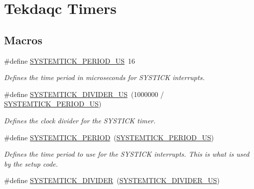 \hypertarget{group__tekdaqc__timers}{\section{Tekdaqc Timers}
\label{group__tekdaqc__timers}
}
\subsection*{Macros}
\begin{DoxyCompactItemize}
\item 
\hypertarget{group__tekdaqc__timers_gacc6f2ef6fc22ccd784d38b7de6f22492}{\#define \hyperlink{group__tekdaqc__timers_gacc6f2ef6fc22ccd784d38b7de6f22492}{S\-Y\-S\-T\-E\-M\-T\-I\-C\-K\-\_\-\-P\-E\-R\-I\-O\-D\-\_\-\-U\-S}~16}\label{group__tekdaqc__timers_gacc6f2ef6fc22ccd784d38b7de6f22492}

\begin{DoxyCompactList}\small\item\em Defines the time period in microseconds for S\-Y\-S\-T\-I\-C\-K interrupts. \end{DoxyCompactList}\item 
\hypertarget{group__tekdaqc__timers_gad688df41f76297601fe702bd24190525}{\#define \hyperlink{group__tekdaqc__timers_gad688df41f76297601fe702bd24190525}{S\-Y\-S\-T\-E\-M\-T\-I\-C\-K\-\_\-\-D\-I\-V\-I\-D\-E\-R\-\_\-\-U\-S}~(1000000 / \hyperlink{group__tekdaqc__timers_gacc6f2ef6fc22ccd784d38b7de6f22492}{S\-Y\-S\-T\-E\-M\-T\-I\-C\-K\-\_\-\-P\-E\-R\-I\-O\-D\-\_\-\-U\-S})}\label{group__tekdaqc__timers_gad688df41f76297601fe702bd24190525}

\begin{DoxyCompactList}\small\item\em Defines the clock divider for the S\-Y\-S\-T\-I\-C\-K timer. \end{DoxyCompactList}\item 
\hypertarget{group__tekdaqc__timers_ga7061932395158f1a4988896f1b32a8b3}{\#define \hyperlink{group__tekdaqc__timers_ga7061932395158f1a4988896f1b32a8b3}{S\-Y\-S\-T\-E\-M\-T\-I\-C\-K\-\_\-\-P\-E\-R\-I\-O\-D}~(\hyperlink{group__tekdaqc__timers_gacc6f2ef6fc22ccd784d38b7de6f22492}{S\-Y\-S\-T\-E\-M\-T\-I\-C\-K\-\_\-\-P\-E\-R\-I\-O\-D\-\_\-\-U\-S})}\label{group__tekdaqc__timers_ga7061932395158f1a4988896f1b32a8b3}

\begin{DoxyCompactList}\small\item\em Defines the time period to use for the S\-Y\-S\-T\-I\-C\-K interrupts. This is what is used by the setup code. \end{DoxyCompactList}\item 
\hypertarget{group__tekdaqc__timers_gac55d476efeca526dcd924406fc9917bf}{\#define \hyperlink{group__tekdaqc__timers_gac55d476efeca526dcd924406fc9917bf}{S\-Y\-S\-T\-E\-M\-T\-I\-C\-K\-\_\-\-D\-I\-V\-I\-D\-E\-R}~(\hyperlink{group__tekdaqc__timers_gad688df41f76297601fe702bd24190525}{S\-Y\-S\-T\-E\-M\-T\-I\-C\-K\-\_\-\-D\-I\-V\-I\-D\-E\-R\-\_\-\-U\-S})}\label{group__tekdaqc__timers_gac55d476efeca526dcd924406fc9917bf}


\end{DoxyCompactItemize}

